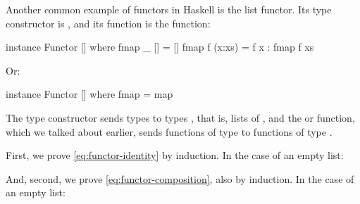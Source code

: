 \begin{example}
  \label{ex:functor-list-haskell}


  Another common example of functors in Haskell is the list functor.
  Its type constructor is \texthaskell{[]}, and its 
  function is the  function:
  \begin{codehaskell}
instance Functor [] where
  fmap _ []     = []
  fmap f (x:xs) = f x : fmap f xs
  \end{codehaskell}
  Or:
  \begin{codehaskell}
instance Functor [] where
  fmap = map
  \end{codehaskell}
  The \texthaskell{[]} type constructor sends types  to
  types \texthaskell{[a]}, that is, lists of , and the
   or  function, which we talked
  about earlier, sends functions of type  to
  functions of type \texthaskell{[a] -> [b]}.

  First, we prove \eqref{eq:functor-identity} by induction. In the
  case of an empty list:

  \vspace{1em}
  \case{\texthaskell{[]}}
  \begin{steps}
    \steph{[]}
  \end{steps}
  \begin{steps}
      \eqbyihh{}
  \end{steps}
  And, second, we prove \eqref{eq:functor-composition}, also by
  induction. In the case of an empty list:

  \vspace{1em}
  \case{\texthaskell{[]}}
  \begin{steps}
    \steph{[]}
  \end{steps}
  \begin{steps}
      \eqbyihh{}
  \end{steps}

\end{example}

